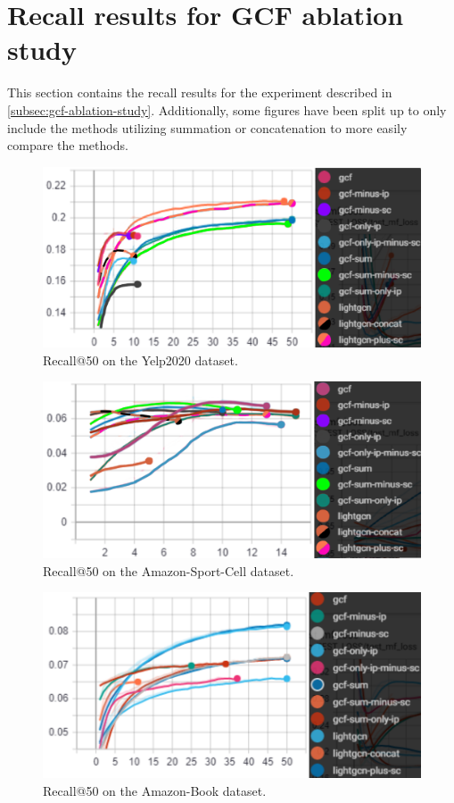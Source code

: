 \section{Recall results for GCF ablation study}\label{app:recall-results-gcf-ablation}
This section contains the recall results for the experiment described in \autoref{subsec:gcf-ablation-study}.
Additionally, some figures have been split up to only include the methods utilizing summation or concatenation to more easily compare the methods.
\begin{figure}[h!]
    \includegraphics[width=\linewidth]{figures/gcf-all-recall.png}
    \caption{Recall@50 on the Yelp2020 dataset.}
    \label{fig:GCF-recall-ablation-study}
\end{figure}
\begin{figure}[h!]
    \includegraphics[width=\linewidth]{figures/amazon-cell-sport-gcf-all-recall.png}
    \caption{Recall@50 on the Amazon-Sport-Cell dataset.}
    \label{fig:GCF-recall-ablation-study-amazon-cell-sport}
\end{figure}
\begin{figure}[h!]
    \includegraphics[width=\linewidth]{figures/amazon-book-gcf-all-recall.png}
    \caption{Recall@50 on the Amazon-Book dataset.}
    \label{fig:GCF-recall-ablation-study-amazon-book}
\end{figure}
